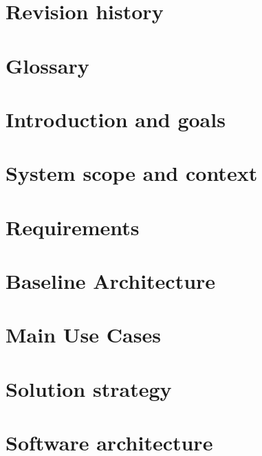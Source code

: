 \documentclass[11pt, oneside]{book}
\begin{document}


\frontmatter

\chapter{Revision history}
\label{chp:rev_his}




\chapter{Glossary}
\label{chp:glos}


\mainmatter

\chapter{Introduction and goals}
\label{chp:intro}


\chapter{System scope and context}
\label{chp:syst_context}


\chapter{Requirements}
\label{chp:requirements}


\chapter{Baseline Architecture}
\label{chp:baseline}


\chapter{Main Use Cases}
\label{chp:usecases}


\chapter{Solution strategy}
\label{chp:sol_strategy}


\chapter{Software architecture}
\label{chp:soft_arch}

\end{document}

